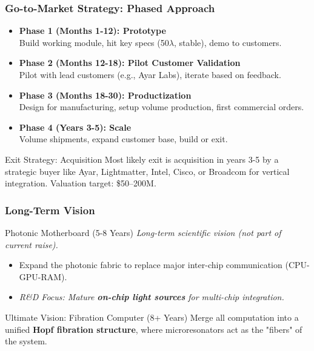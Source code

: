 \documentclass{beamer}
\begin{document}
\begin{frame}
    \frametitle{Go-to-Market Strategy: Phased Approach}
    
    \begin{itemize}
        \item \textbf{Phase 1 (Months 1-12): Prototype} \\
        Build working module, hit key specs (50$\lambda$, stable), demo to customers.
        \item \textbf{Phase 2 (Months 12-18): Pilot Customer Validation} \\
        Pilot with lead customers (e.g., Ayar Labs), iterate based on feedback.
        \item \textbf{Phase 3 (Months 18-30): Productization} \\
        Design for manufacturing, setup volume production, first commercial orders.
        \item \textbf{Phase 4 (Years 3-5): Scale} \\
        Volume shipments, expand customer base, build or exit.
    \end{itemize}
    
    \begin{block}{Exit Strategy: Acquisition}
        Most likely exit is acquisition in years 3-5 by a strategic buyer like Ayar, Lightmatter, Intel, Cisco, or Broadcom for vertical integration. Valuation target: \$50--200M.
    \end{block}
\end{frame}

\begin{frame}
    \frametitle{Long-Term Vision}
    
    \begin{block}{Photonic Motherboard (5-8 Years)}
        \textit{Long-term scientific vision (not part of current raise).}
        \begin{itemize}
            \item Expand the photonic fabric to replace major inter-chip communication (CPU-GPU-RAM).
            \item \textit{R\&D Focus: Mature \textbf{on-chip light sources} for multi-chip integration.}
        \end{itemize}
    \end{block}

    \begin{alertblock}{Ultimate Vision: Fibration Computer (8+ Years)}
        Merge all computation into a unified \textbf{Hopf fibration structure}, where microresonators act as the "fibers" of the system.
    \end{alertblock}
\end{frame}
\end{document}
